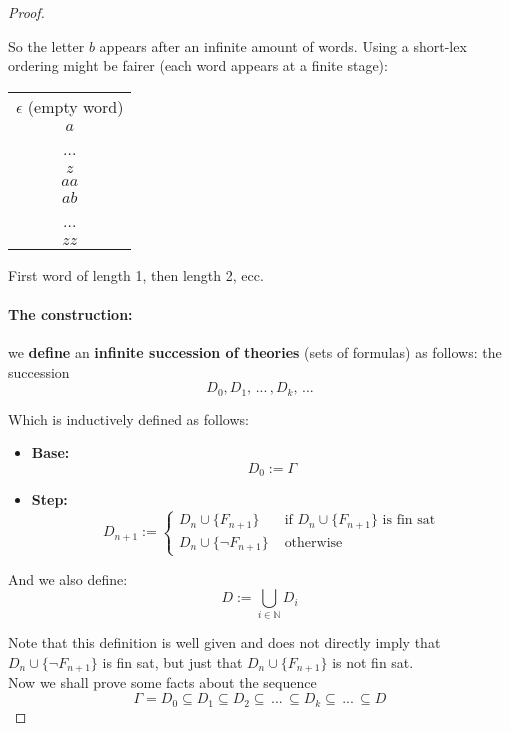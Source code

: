 \documentclass[11pt]{article}
\begin{document}
\begin{proof}
\begin{itemize}
			So the letter $b$ appears after an infinite amount of words. Using a short-lex ordering might be fairer (each word appears at a finite stage):
			\begin{center}
				\begin{tabular}{| c |}
					\hline
					$\epsilon$ (empty word)\\
					$a$\\
					... \\
					$z$ \\
					$aa$\\
					$ab$\\
					...\\
					$zz$\\
					\hline
				\end{tabular}
			\end{center}
			First word of length 1, then length 2, ecc.
		\end{itemize}
		
		\newpage
		
		\paragraph{The construction:} we \textbf{define} an \textbf{infinite succession of theories} (sets of formulas) as follows: the succession 
		$$ D_0, D_1, \, ... \, , D_k , \, ... $$
		
		Which is inductively defined as follows:
		\begin{itemize}
			\item \textbf{Base:} 
			$$D_0 := \Gamma$$
			
			\item \textbf{Step:}
			$$ D_{n+1} := \begin{cases}
				D_n \cup \{F_{n+1}\} \; & \text{ if } D_n \cup \{F_{n+1}\} \text{ is fin sat} \\
				D_n \cup \{\neg F_{n+1}\}  & \text{ otherwise }
			\end{cases}
			$$
		\end{itemize}
		And we also define: 
		$$ D := \bigcup_{i \in \mathbb{N}} D_i$$
		
		Note that this definition is well given and does not directly imply that $D_n \cup \{\neg F_{n+1}\}$ is fin sat, but just that $D_n \cup \{F_{n+1}\}$ is not fin sat.\\
		
		Now we shall prove some facts about the sequence
		$$ \Gamma = D_0 \subseteq D_1 \subseteq D_2 \subseteq \, ... \, \subseteq D_k \subseteq \, ... \, \subseteq D $$
		

\end{proof}
\end{document}
